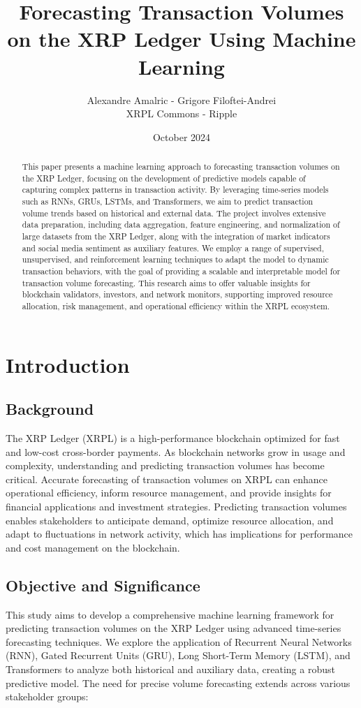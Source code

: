 \documentclass{article}
\title{Forecasting Transaction Volumes on the XRP Ledger Using Machine Learning}
\author{Alexandre Amalric - Grigore Filoftei-Andrei \\ XRPL Commons - Ripple}
\date{October 2024}
\begin{document}
\maketitle

\begin{abstract}
This paper presents a machine learning approach to forecasting transaction volumes on the XRP Ledger, focusing on the development of predictive models capable of capturing complex patterns in transaction activity. By leveraging time-series models such as RNNs, GRUs, LSTMs, and Transformers, we aim to predict transaction volume trends based on historical and external data. The project involves extensive data preparation, including data aggregation, feature engineering, and normalization of large datasets from the XRP Ledger, along with the integration of market indicators and social media sentiment as auxiliary features. We employ a range of supervised, unsupervised, and reinforcement learning techniques to adapt the model to dynamic transaction behaviors, with the goal of providing a scalable and interpretable model for transaction volume forecasting. This research aims to offer valuable insights for blockchain validators, investors, and network monitors, supporting improved resource allocation, risk management, and operational efficiency within the XRPL ecosystem.
\end{abstract}

\section{Introduction}

\subsection{Background}
The XRP Ledger (XRPL) is a high-performance blockchain optimized for fast and low-cost cross-border payments. As blockchain networks grow in usage and complexity, understanding and predicting transaction volumes has become critical. Accurate forecasting of transaction volumes on XRPL can enhance operational efficiency, inform resource management, and provide insights for financial applications and investment strategies. Predicting transaction volumes enables stakeholders to anticipate demand, optimize resource allocation, and adapt to fluctuations in network activity, which has implications for performance and cost management on the blockchain.

\subsection{Objective and Significance}
This study aims to develop a comprehensive machine learning framework for predicting transaction volumes on the XRP Ledger using advanced time-series forecasting techniques. We explore the application of Recurrent Neural Networks (RNN), Gated Recurrent Units (GRU), Long Short-Term Memory (LSTM), and Transformers to analyze both historical and auxiliary data, creating a robust predictive model. The need for precise volume forecasting extends across various stakeholder groups:
\end{document}
